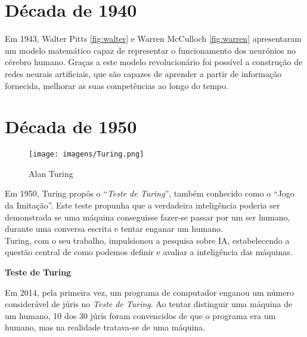 \documentclass{report}
\begin{document}
\section{Década de 1940}

Em 1943, Walter Pitts \ref{fig:walter} e Warren McCulloch \ref{fig:warren} apresentaram um modelo matemático capaz de representar o funcionamento dos neurónios no cérebro humano. Graças a este modelo revolucionário foi possível a construção de redes neurais artificiais, que são capazes de aprender a partir de informação fornecida, melhorar as suas competências ao longo do tempo.

\begin{figure}[ht]
    \centering
    \caption{}
    
\end{figure}

\section{Década de 1950}

\begin{wrapfigure}{r}{0.4\textwidth} 
   \centering
    \texttt{[image: imagens/Turing.png]}
    \footnotesize{\caption{Alan Turing}}
    \label{fig:turing}
\end{wrapfigure}
\vspace{30pt}
Em 1950, Turing propôs o “\textit{Teste de Turing}”, também conhecido como o “Jogo da Imitação”. Este teste propunha que a verdadeira inteligência poderia ser demonstrada se uma máquina conseguisse fazer-se passar por um ser humano, durante uma conversa escrita e tentar enganar um humano.
\\
 Turing, com o seu trabalho, impulsionou a pesquisa sobre \ac{IA}, estabelecendo a questão central de como podemos definir e avaliar a inteligência das máquinas. 
\clearpage
\begin{center}
    \Large\textbf{Teste de Turing}
\end{center}
Em 2014, pela primeira vez, um programa de computador enganou um número considerável de júris no \textit{Teste de Turing}. Ao tentar distinguir uma máquina de um humano, 10 dos 30 júris foram convencidos de que o programa era um humano, mas na realidade tratava-se de uma máquina.
\end{document}
